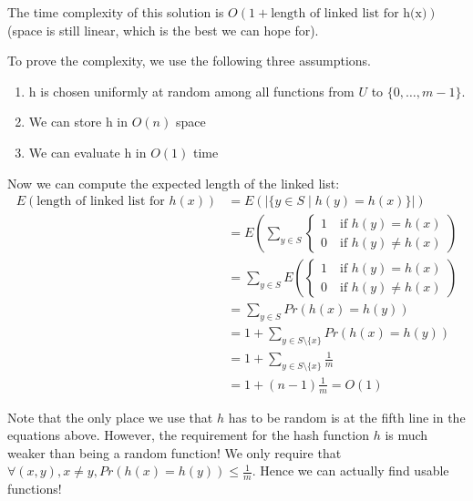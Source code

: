         The time complexity of this solution is $O(1 + \text{length of linked list for h(x)})$ (space is still linear, which is the best we can hope for).

        To prove the complexity, we use the following three assumptions.
        \begin{enumerate}[label=\Roman*]
            \item h is chosen uniformly at random among all functions from $U$ to $\{0, \ldots, m-1\}$.
            \item We can store h in $O(n)$ space
            \item We can evaluate h in $O(1)$ time
        \end{enumerate}
        Now we can compute the expected length of the linked list:
        \begin{align*}
            E(\text{length of linked list for } h(x)) &= E(|\{y \in S \mid h(y) = h(x)\}|) \\
            &= E\left(\sum_{y \in S}
                \begin{cases}
                    1 \quad \text{if } h(y) = h(x) \\
                    0 \quad \text{if } h(y) \not = h(x)
                \end{cases}
                \right) \\
            &= \sum_{y \in S} E\left(
                \begin{cases}
                    1 \quad \text{if } h(y) = h(x) \\
                    0 \quad \text{if } h(y) \not = h(x)
                \end{cases}
                \right) \\
            &= \sum_{y \in S} Pr(h(x) = h(y)) \\
            &= 1 + \sum_{y \in S \setminus \{x\}} Pr(h(x) = h(y)) \\
            &= 1 + \sum_{y \in S \setminus \{x\}} \frac{1}{m} \\
            &= 1 + (n - 1) \frac{1}{m} = O(1)
        \end{align*}

        Note that the only place we use that $h$ has to be random is at the fifth line in the equations above. However, the requirement for the hash function $h$ is much weaker than being a random function! We only require that $\forall (x, y), x \not = y, Pr(h(x) = h(y)) \leq \frac{1}{m}$. Hence we can actually find usable functions!

